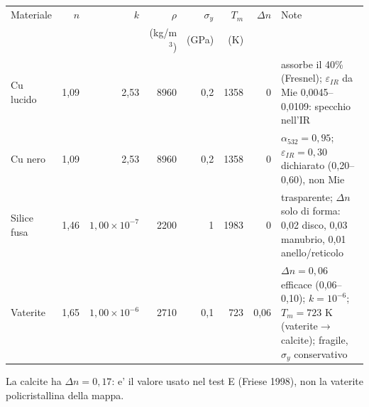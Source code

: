 \begin{tabular}{@{}lrrrrrrp{3.9cm}@{}}
\hline
Materiale & $n$ & $k$ & $\rho$ & $\sigma_y$ & $T_m$ & $\Delta n$ & Note \\
 & & & (kg/m$^3$) & (GPa) & (K) & & \\
\hline
Cu lucido & 1{,}09 & 2{,}53 & 8960 & 0{,}2 & 1358 & 0 & assorbe il 40\% (Fresnel); $\varepsilon_{IR}$ da Mie 0,0045--0,0109: specchio nell'IR \\
Cu nero & 1{,}09 & 2{,}53 & 8960 & 0{,}2 & 1358 & 0 & $\alpha_{532}=0{,}95$; $\varepsilon_{IR}=0{,}30$ dichiarato (0,20--0,60), non Mie \\
Silice fusa & 1{,}46 & $1{,}00\times10^{-7}$ & 2200 & 1 & 1983 & 0 & trasparente; $\Delta n$ solo di forma: 0,02 disco, 0,03 manubrio, 0,01 anello/reticolo \\
Vaterite & 1{,}65 & $1{,}00\times10^{-6}$ & 2710 & 0{,}1 & 723 & 0{,}06 & $\Delta n=0{,}06$ efficace (0,06--0,10); $k=10^{-6}$; $T_m=723$ K (vaterite$\to$calcite); fragile, $\sigma_y$ conservativo \\
\hline
\end{tabular}

\par\smallskip\noindent\footnotesize La calcite ha $\Delta n=0{,}17$: e' il valore usato nel test E (Friese 1998), non la vaterite policristallina della mappa.
